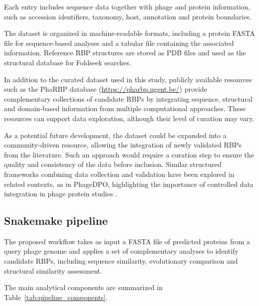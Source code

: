 \documentclass[runningheads]{llncs}
\begin{document}
Each entry includes sequence data together with phage and protein information, such as accession identifiers, taxonomy, host, annotation and protein boundaries.

The dataset is organized in machine-readable formats, including a protein FASTA file for sequence-based analyses and a tabular file containing the associated information. Reference RBP structures are stored as PDB files and used as the structural database for Foldseek searches.

In addition to the curated dataset used in this study, publicly available resources such as the PhaRBP database (\url{https://pharbp.ugent.be/}) provide complementary collections of candidate RBPs by integrating sequence, structural and domain-based information from multiple computational approaches. These resources can support data exploration, although their level of curation may vary.

As a potential future development, the dataset could be expanded into a community-driven resource, allowing the integration of newly validated RBPs from the literature. Such an approach would require a curation step to ensure the quality and consistency of the data before inclusion. Similar structured frameworks combining data collection and validation have been explored in related contexts, as in PhageDPO, highlighting the importance of controlled data integration in phage protein studies \cite{vieira2025}.

\subsection{Snakemake pipeline}

The proposed workflow takes as input a FASTA file of predicted proteins from a query phage genome and applies a set of complementary analyses to identify candidate RBPs, including sequence similarity, evolutionary comparison and structural similarity assessment.

The main analytical components are summarized in Table~\ref{tab:pipeline_components}.
\end{document}
